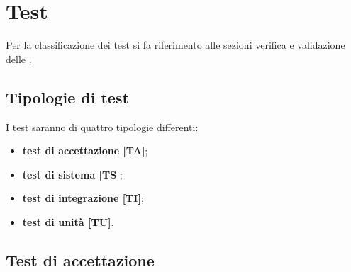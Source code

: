\section{Test}
	Per la classificazione dei test si fa riferimento alle sezioni verifica e validazione delle .


	\subsection{Tipologie di test}
		I test saranno di quattro tipologie differenti:
		\begin{itemize}

			\item \textbf{test di accettazione [TA]};
			\item \textbf{test di sistema [TS]};
			\item \textbf{test di integrazione [TI]};
			\item \textbf{test di unità [TU]}.

		\end{itemize}

	\subsection{Test di accettazione}


